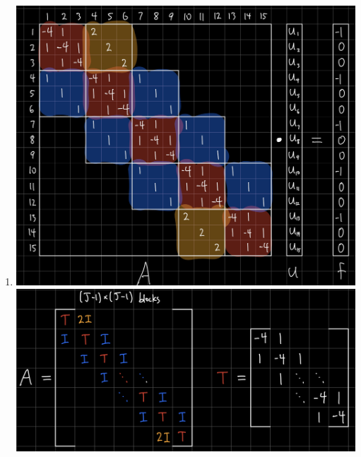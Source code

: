 \documentclass{article}
\begin{document}
\begin{enumerate}
\begin{enumerate}
	\item
	\includegraphics[scale=.1]{hw6 b full}
	\includegraphics[scale=.08]{hw6 b block}

	
	

\end{enumerate}
\end{enumerate}
\end{document}
